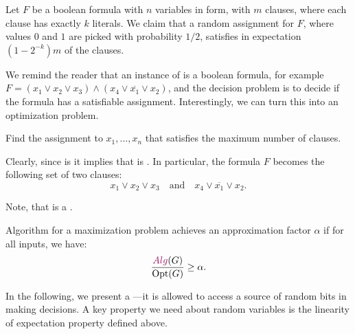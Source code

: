 

Let $F$ be a boolean formula with $n$ variables in \CNF{} form, with $m$
clauses, where each clause has exactly $k$ literals. We claim that a
random assignment for $F$, where values $0$ and $1$ are picked with
probability $1/2$, satisfies in expectation $(1-2^{-k}) m$ of the
clauses.



We remind the reader that an instance of  is a boolean
formula, for example $F=(x_{1} \lor x_{2} \lor x_{3})\land (x_{4} \lor
\overline{x_{1}} \lor x_{2})$, and the decision problem is to decide if the
formula has a satisfiable assignment.  Interestingly, we can turn this
into an optimization problem.

%
{Find the assignment to $x_{1},\dots,x_{n}$ that satisfies the maximum
   number of clauses.}%

Clearly, since  is \NPComplete{} it implies that
 is \NPHard{}. In particular, the formula $F$
becomes the following set of two clauses:
\begin{equation*}
    x_{1} \lor x_{2} \lor x_{3} \quad\text{and}\quad
    x_{4} \lor \overline{x_{1}} \lor x_{2}.
\end{equation*}

Note, that  is a .

\begin{defn}
    Algorithm  for a maximization problem achieves an
    approximation factor $\alpha$ if for all inputs, we have:
    \begin{equation*}
        \frac{\Algorithm{Alg}(G)}{\mathrm{Opt}(G)}\geq\alpha.
    \end{equation*}
\end{defn}

In the following, we present a ---it is allowed to access a source of
random bits in making decisions. A key property we need about random
variables is the linearity of expectation property defined above.



